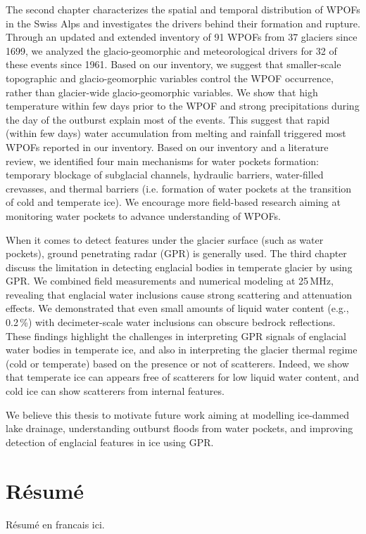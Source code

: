 The second chapter characterizes the spatial and temporal distribution of WPOFs in the Swiss Alps and investigates the drivers behind their formation and rupture. Through an updated and extended inventory of 91 WPOFs from 37 glaciers since 1699, we analyzed the glacio-geomorphic and meteorological drivers for 32 of these events since 1961. Based on our inventory, we suggest that smaller-scale topographic and glacio-geomorphic variables control the WPOF occurrence, rather than glacier-wide glacio-geomorphic variables. We show that high temperature within few days prior to the WPOF and strong precipitations during the day of the outburst explain most of the events. This suggest that rapid (within few days) water accumulation from melting and rainfall triggered most WPOFs reported in our inventory. Based on our inventory and a literature review, we identified four main mechanisms for water pockets formation: temporary blockage of subglacial channels, hydraulic barriers, water-filled crevasses, and thermal barriers (i.e. formation of water pockets at the transition of cold and temperate ice). We encourage more field-based research aiming at monitoring water pockets to advance understanding of WPOFs.
%

When it comes to detect features under the glacier surface (such as water pockets), ground penetrating radar (GPR) is generally used. The third chapter discuss the limitation in detecting englacial bodies in temperate glacier by using GPR. We combined field measurements and numerical modeling at 25\,MHz, revealing that englacial water inclusions cause strong scattering and attenuation effects. We demonstrated that even small amounts of liquid water content (e.g., 0.2\,\%) with decimeter-scale water inclusions can obscure bedrock reflections. These findings highlight the challenges in interpreting GPR signals of englacial water bodies in temperate ice, and also in interpreting the glacier thermal regime (cold or temperate) based on the presence or not of scatterers. Indeed, we show that temperate ice can appears free of scatterers for low liquid water content, and cold ice can show scatterers from internal features. 
%

We believe this thesis to motivate future work aiming at modelling ice-dammed lake drainage, understanding outburst floods from water pockets, and improving detection of englacial features in ice using GPR.



\endgroup

\clearpage

\begingroup
\let\clearpage\relax
\let\cleardoublepage\relax
\let\cleardoublepage\relax

\chapter*{Résumé}

Résumé en francais ici.


\endgroup

\vfill
